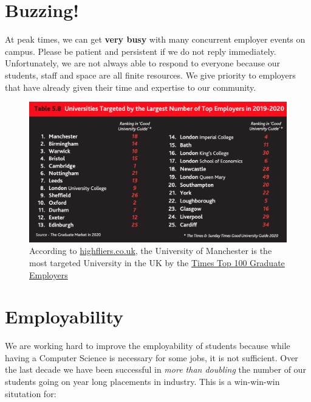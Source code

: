 \documentclass[
  12pt,
]{book}
\begin{document}
\hypertarget{buzzing}{%
\section{Buzzing!}\label{buzzing}}

At peak times, we can get \textbf{very busy} with many concurrent employer events on campus. \citep{highfliers2020} Please be patient and persistent if we do not reply immediately. Unfortunately, we are not always able to respond to everyone because our students, staff and space are all finite resources. We give priority to employers that have already given their time and expertise to our community.



\begin{figure}

{\centering \includegraphics[width=1\linewidth]{images/high-fliers-table} 

}

\caption{According to \href{https://www.highfliers.co.uk}{highfliers.co.uk}, the University of Manchester is the most targeted University in the UK by the \href{https://www.top100graduateemployers.com}{Times Top 100 Graduate Employers} \citep{highfliers2020}}\label{fig:unnamed-chunk-4}
\end{figure}

\hypertarget{employability}{%
\section{Employability}\label{employability}}

We are working hard to improve the employability of students because while having a Computer Science is necessary for some jobs, it is not sufficient. \citep{unemployed, shadboltreview, fincherreview, finchergecco} Over the last decade we have been successful in \emph{more than doubling} the number of our students going on year long placements in industry. This is a win-win-win situtation for:
\end{document}
